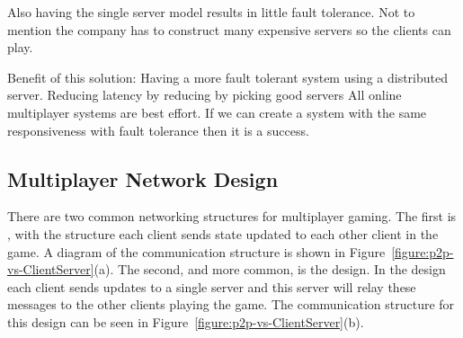 Also having the single server model results in little fault tolerance. Not to mention the company has to construct many expensive servers so the clients can play.

Benefit of this solution:
Having a more fault tolerant system using a distributed server. 
Reducing latency by reducing by picking good servers
All online multiplayer systems are best effort. If we can create a system with the same responsiveness with fault tolerance then it is a success.

\subsection{Multiplayer Network Design}

	There are two common networking structures for multiplayer gaming. The first is \ptoP, with the structure each client sends state updated to each other client in the game. A diagram of the \ptoP communication structure is shown in Figure~\ref{figure:p2p-vs-ClientServer}(a).
	The second, and more common, is the \clientServer design. In the \clientServer design each client sends updates to a single server and this server will relay these messages to the other clients playing the game. The communication structure for this design can be seen in Figure~\ref{figure:p2p-vs-ClientServer}(b).
	
